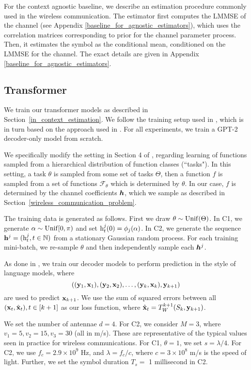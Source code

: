 \documentclass[journal,letterpaper,onecolumn]{IEEEtran}
\begin{document}
For the context agnostic baseline, we describe an estimation procedure commonly used in the wireless communication. The estimator first computes the LMMSE of the channel (see Appendix \ref{baseline_for_agnostic_estimators}), which uses the correlation matrices corresponding to prior for the channel parameter process. Then, it estimates the symbol as the conditional mean, conditioned on the LMMSE for the channel. The exact details are given in Appendix \ref{baseline_for_agnostic_estimators}.

\subsection{Transformer} \label{training}
We train our transformer models as described in Section~\ref{in_context_estimation}. We follow the training setup used in \cite{ahuja2023incontext}, which is in turn based on the approach used in \cite{garg2023transformers}. For all experiments, we train a GPT-2 decoder-only model from scratch.

We specifically modify the setting in Section 4 of \cite{ahuja2023incontext}, regarding learning of functions sampled from a hierarchical distribution of function classes (``tasks"). In this setting, a task $\theta$ is sampled from some set of tasks $\Theta$, then a function $f$ is sampled from a set of functions $\mathcal{F}_\theta$ which is determined by $\theta$. In our case, $f$ is determined by the channel coefficients ${\bm{h}}$, which we sample as described in Section~\ref{wireless_communication_problem}.

The training data is generated as follows. First we draw $\theta \sim {\rm Unif}(\Theta)$. In C1, we generate $\alpha \sim {\rm Unif}[0, \pi)$ and set ${\textnormal{h}}^j_t(0) = \phi_j(\alpha)$. In C2, we generate the sequence ${\mathbf{h}}^j = ({\textnormal{h}}_t^j, t\in {\mathbb{N}})$ from a stationary Gaussian random process. For each training mini-batch, we re-sample $\theta$ and then independently sample each ${\bm{h}}^j$.

As done in \cite{ahuja2023incontext}, we train our decoder models to perform prediction in the style of language models, where $$(({\mathbf{y}}_1, {\mathbf{x}}_1), ({\mathbf{y}}_2, {\mathbf{x}}_2), \dots, ({\mathbf{y}}_k, {\mathbf{x}}_k), {\mathbf{y}}_{k+1})$$ are used to predict ${\mathbf{x}}_{k+1}$. We use the sum of squared errors between all $({\mathbf{x}}_t, \hat{{\mathbf{x}}}_t), t\in[k+1]$ as our loss function, where $\hat{{\mathbf{x}}}_t =  T_W^{k+1}(S_k, {\mathbf{y}}_{k+1})$. 

We set the number of antennae $d = 4$. For C2, we consider $M = 3$, where $v_1 = 5, v_2 = 15, v_3 = 30$ (all in m/s). These are representative of the typical values seen in practice for wireless communications. For C1, $\theta = 1$, we set $s = \lambda/4$. For C2, we use $f_c = 2.9 \times 10^9$ Hz, and $\lambda = f_c/c$, where $c = 3\times 10^8$ m/s is the speed of light. Further, we set the symbol duration $T_s =$ 1 millisecond in C2.
\end{document}
